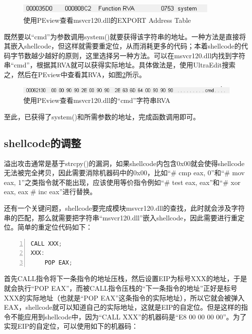 \documentclass[bachelor]{thesis-uestc}
\begin{document}
\begin{figure}[htbp]
	\centering\includegraphics[width=10cm]{images/libc_system_rva.png}
	\caption{使用PEview查看msvcr120.dll的EXPORT Address Table}
	\label{fig:libc_system_rva}
\end{figure}

既然要以``cmd''为参数调用system()就要获得该字符串的地址。一种方法是直接将其嵌入shellcode，但这样就需要重定位，从而消耗更多的代码；本着shellcode的代码字节数越少越好的原则，这里选择另一种方法。可以在msvcr120.dll内找到字符串``cmd''，根据其RVA就可以获得实际地址。具体做法是，使用UltraEdit搜索之，然后在PEview中查看其RVA，如图\ref{fig:libc_cmd_rva}所示。

\begin{figure}[htbp]
	\centering\includegraphics[width=12cm]{images/libc_cmd_rva.png}
	\caption{使用PEview查看msvcr120.dll的``cmd''字符串RVA}
	\label{fig:libc_cmd_rva}
\end{figure}

至此，已获得了system()和所需参数的地址，完成函数调用即可。

\subsection{shellcode的调整}
溢出攻击通常是基于strcpy()的漏洞，如果shellcode内包含0x00就会使得shellcode无法被完全拷贝，因此需要消除机器码中的0x00，比如``\# cmp eax, 0''和``\# mov eax, 1''之类指令就不能出现，应该使用等价指令例如``\# test eax, eax''和``\# xor eax, eax \# inc eax''进行替换。\par
还有一个关键问题，shellcode要完成模块msvcr120.dll的查找，此时就会涉及字符串的匹配，那么就需要把字符串``msvcr120.dll''嵌入shellcode，因此需要进行重定位。简单的重定位代码如下：

\begin{lstlisting}[language=C++, basicstyle=\ttfamily\tiny, numbers=left, numberstyle=\tiny, keywordstyle=\color{blue!70}, commentstyle=\color{red!50!green!50!blue!50}, frame=shadowbox, rulesepcolor=\color{red!20!green!20!blue!20}]
	CALL XXX;
XXX:
	POP EAX;
\end{lstlisting}

首先CALL指令将下一条指令的地址压栈，然后设置EIP为标号XXX的地址，于是就会执行``POP EAX''，而被CALL指令压栈的``下一条指令的地址''正好是标号XXX的实际地址（也就是``POP EAX''这条指令的实际地址），所以它就会被弹入EAX，shellcode就可以知道自己的实际地址，这就是EIP的自定位。但是这样的指令不能应用到shellcode中，因为``CALL XXX''的机器码是``E8 00 00 00 00''。为了实现EIP的自定位，可以使用如下的机器码：
\end{document}
